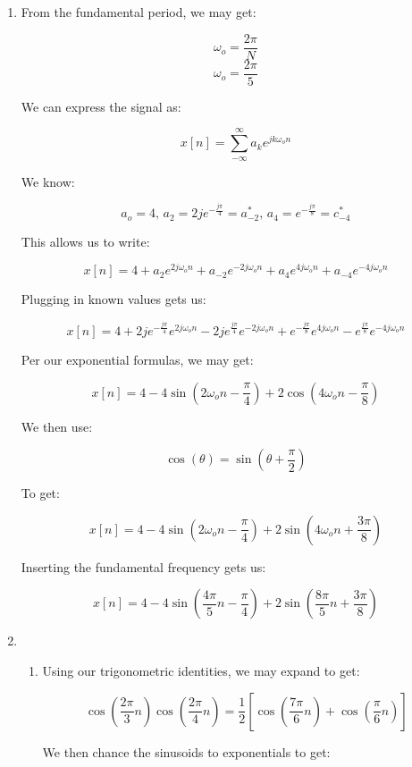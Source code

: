 \begin{enumerate}

  \item From the fundamental period, we may get:

    $$\omega_o=\frac{2\pi}{N}$$
    $$\omega_o=\frac{2\pi}{5}$$

    We can express the signal as:

    $$x[n]=\sum_{-\infty}^{\infty} a_ke^{jk\omega_o n}$$

    We know:

    $$a_o=4,\,a_2=2je^{-\frac{j\pi}{4}}=a_{-2}^{*},\,a_4=e^{-\frac{j\pi}{8}}=c_{-4}^{*}$$

    This allows us to write:

    $$x[n]=4+a_2e^{2j\omega_o n}+a_{-2}e^{-2j\omega_on}+a_{4}e^{4j\omega_o n}+a_{-4}e^{-4j\omega_o n}$$

    Plugging in known values gets us:

    $$x[n]=4+2je^{-\frac{j\pi}{4}}e^{2j\omega_o n}-2je^{\frac{j\pi}{4}}e^{-2j\omega_on}+e^{-\frac{j\pi}{8}}e^{4j\omega_o n}-e^{\frac{j\pi}{8}}e^{-4j\omega_o n}$$

    Per our exponential formulas, we may get:

    $$x[n]=4-4\sin\left( 2\omega_on-\frac{\pi}{4} \right)+2\cos\left( 4\omega_on-\frac{\pi}{8} \right)$$

    We then use:

    $$\cos(\theta)=\sin\left( \theta+\frac{\pi}{2} \right)$$

    To get:

    $$x[n]=4-4\sin\left( 2\omega_on-\frac{\pi}{4} \right)+2\sin\left( 4\omega_on+\frac{3\pi}{8} \right)$$

    Inserting the fundamental frequency gets us:

    $$\boxed{x[n]=4-4\sin\left( \frac{4\pi}{5}n-\frac{\pi}{4} \right)+2\sin\left(\frac{8\pi}{5}n+\frac{3\pi}{8} \right)}$$

  \item

    \begin{enumerate}

      \item Using our trigonometric identities, we may expand to get:

        $$\cos\left( \frac{2\pi}{3}n \right)\cos\left( \frac{2\pi}{4}n \right)=\frac{1}{2}\left[ \cos\left( \frac{7\pi}{6}n \right)+\cos\left( \frac{\pi}{6}n \right) \right]$$

        We then chance the sinusoids to exponentials to get:


\end{enumerate}
\end{enumerate}
